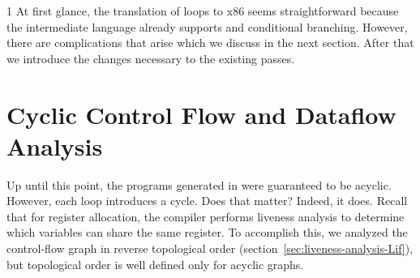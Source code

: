 \documentclass[7x10]{TimesAPriori_MIT}%
\def\pythonEd{1}
\def\edition{1}
\newcommand{\pythonColor}[0]{}
\numberwithin{theorem}{chapter}
\numberwithin{definition}{chapter}
\numberwithin{equation}{chapter}
\begin{document}
{\if\edition\pythonEd\pythonColor
%
At first glance, the translation of  loops to x86 seems
straightforward because the \LangCIf{} intermediate language already
supports  and conditional branching. However, there are
complications that arise which we discuss in the next section. After
that we introduce the changes necessary to the existing passes.
%
\fi}

\section{Cyclic Control Flow and Dataflow Analysis}
\label{sec:dataflow-analysis}

Up until this point, the programs generated in
 were guaranteed to be acyclic. However, each
 loop introduces a cycle. Does that matter?
%
Indeed, it does.  Recall that for register allocation, the compiler
performs liveness analysis to determine which variables can share the
same register.  To accomplish this, we analyzed the control-flow graph
in reverse topological order
(section~\ref{sec:liveness-analysis-Lif}), but topological order is
well defined only for acyclic graphs.
\end{document}
